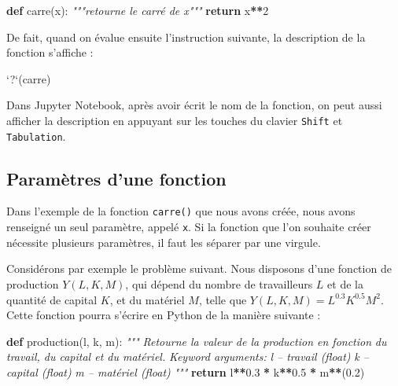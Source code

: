 \documentclass[12pt,]{book}
\newenvironment{Shaded}{\begin{snugshade}}{\end{snugshade}}
\newcommand{\KeywordTok}[1]{\textcolor[rgb]{0.13,0.29,0.53}{\textbf{#1}}}
\newcommand{\DataTypeTok}[1]{\textcolor[rgb]{0.13,0.29,0.53}{#1}}
\newcommand{\DecValTok}[1]{\textcolor[rgb]{0.00,0.00,0.81}{#1}}
\newcommand{\FloatTok}[1]{\textcolor[rgb]{0.00,0.00,0.81}{#1}}
\newcommand{\StringTok}[1]{\textcolor[rgb]{0.31,0.60,0.02}{#1}}
\newcommand{\CommentTok}[1]{\textcolor[rgb]{0.56,0.35,0.01}{\textit{#1}}}
\newcommand{\ControlFlowTok}[1]{\textcolor[rgb]{0.13,0.29,0.53}{\textbf{#1}}}
\newcommand{\OperatorTok}[1]{\textcolor[rgb]{0.81,0.36,0.00}{\textbf{#1}}}
\newcommand{\NormalTok}[1]{#1}
\numberwithin{equation}{section}
\numberwithin{countremarque}{section}
\begin{document}
\begin{Shaded}
\begin{Highlighting}[]
\KeywordTok{def}\NormalTok{ carre(x):}
  \CommentTok{"""retourne le carré de x"""}
  \ControlFlowTok{return}\NormalTok{ x}\OperatorTok{**}\DecValTok{2}
\end{Highlighting}
\end{Shaded}

De fait, quand on évalue ensuite l'instruction suivante, la description
de la fonction s'affiche :

\begin{Shaded}
\begin{Highlighting}[]
\StringTok{`}\DataTypeTok{?}\StringTok{`}\NormalTok{(carre)}
\end{Highlighting}
\end{Shaded}

Dans Jupyter Notebook, après avoir écrit le nom de la fonction, on peut
aussi afficher la description en appuyant sur les touches du clavier
\texttt{Shift} et \texttt{Tabulation}.

\subsection{Paramètres d'une fonction}\label{parametres-dune-fonction}

Dans l'exemple de la fonction \texttt{carre()} que nous avons créée,
nous avons renseigné un seul paramètre, appelé \texttt{x}. Si la
fonction que l'on souhaite créer nécessite plusieurs paramètres, il faut
les séparer par une virgule.

Considérons par exemple le problème suivant. Nous disposons d'une
fonction de production \(Y(L, K, M)\), qui dépend du nombre de
travailleurs \(L\) et de la quantité de capital \(K\), et du matériel
\(M\), telle que \(Y(L, K, M) = L^{0.3} K^{0.5}M^2\). Cette fonction
pourra s'écrire en Python de la manière suivante :

\begin{Shaded}
\begin{Highlighting}[]
\KeywordTok{def}\NormalTok{ production(l, k, m):}
  \CommentTok{"""}
\CommentTok{  Retourne la valeur de la production en fonction}
\CommentTok{  du travail, du capital et du matériel.}
\CommentTok{  }
\CommentTok{  Keyword arguments:}
\CommentTok{  l -- travail (float)}
\CommentTok{  k -- capital (float)}
\CommentTok{  m -- matériel (float)}
\CommentTok{  """}
  \ControlFlowTok{return}\NormalTok{ l}\OperatorTok{**}\FloatTok{0.3} \OperatorTok{*}\NormalTok{ k}\OperatorTok{**}\FloatTok{0.5} \OperatorTok{*}\NormalTok{ m}\OperatorTok{**}\NormalTok{(}\FloatTok{0.2}\NormalTok{)}
\end{Highlighting}
\end{Shaded}
\end{document}
